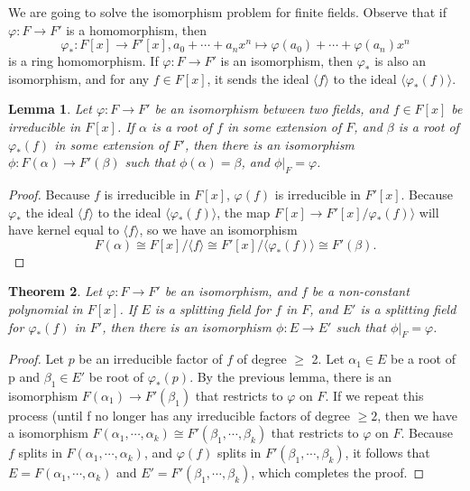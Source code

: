 \documentclass[12pt]{report}
\newtheorem{thm}{Theorem}[section]
\newtheorem{lemma}[thm]{Lemma}
\theoremstyle{definition}
\def\aa{\alpha}
\def\bb{\beta}
\begin{document}
We are going to solve the isomorphism problem for finite fields. Observe that if $\varphi : F \to F'$ is a homomorphism, then
$$\varphi_*:F[x]\to F'[x], a_0+\cdots+a_nx^n\mapsto \varphi(a_0)+\cdots+\varphi(a_n)x^n $$  
is a ring homomorphism. If $\varphi : F \to F'$ is an isomorphism, then $\varphi_*$ is also an isomorphism, and for any $f \in F[x]$, it sends the ideal $\langle f\rangle$ to the ideal $\langle \varphi_*(f)\rangle$.

\begin{lemma}\label{splitlemma1}
    Let $\varphi : F \to F'$ be an isomorphism between two fields, and $f \in F[x]$ be irreducible in $F[x]$. If $\aa$ is a root of $f$ in some extension of $F$, and $\bb$ is a root of $\varphi_*(f)$ in some extension of $F'$, then there is an isomorphism $\phi : F(\aa) \to F'(\bb)$ such that $\phi(\aa) = \bb$, and $\phi|_F= \varphi$.
\end{lemma}

\begin{proof}
    Because $f$ is irreducible in $F[x]$, $\varphi(f)$ is irreducible in $F'[x]$. Because $\varphi_*$ the ideal $\langle f\rangle$ to the ideal $\langle \varphi_*(f)\rangle$, the map $F[x] \to F'[x]/\varphi_*(f)\rangle$ will have kernel equal to $\langle f\rangle$, so we have an isomorphism $$F(\aa)\cong F[x]/\langle f\rangle \cong F'[x]/\langle \varphi_*(f)\rangle \cong F'(\bb).$$
\end{proof}

\begin{thm}
    Let $\varphi: F \to F'$ be an isomorphism, and $f$ be a non-constant polynomial in $F[x]$. If $E$ is a splitting field for $f$ in $F$, and $E'$ is a splitting field for $\varphi_*(f)$ in $F'$, then there is an isomorphism $\phi : E \to E'$ such that $\phi|_F= \varphi$.
\end{thm}

\begin{proof}
    Let $p$ be an irreducible factor of $f$ of degree $\geq$ 2. Let $\aa_1 \in E$ be a root of p and $\bb_1 \in E'$ be root of $\varphi_*(p)$. By the previous lemma, there is an isomorphism $F(\aa_1) \to F'(\bb_1)$ that restricts to $\varphi$ on $F$. If we repeat this process (until f no longer has any irreducible factors of degree $\geq 2$, then we have a isomorphism $F(\aa_1,\cdots, \aa_k) \cong F'(\bb_1,\cdots, \bb_k)$ that restricts to $\varphi$ on $F$. Because $f$ splits in $F(\aa_1,\cdots, \aa_k)$, and $\varphi(f)$ splits in $F'(\bb_1,\cdots, \bb_k)$, it follows that $E = F(\aa_1,\cdots, \aa_k)$ and $E' = F'(\bb_1,\cdots, \bb_k)$, which completes the proof.
\end{proof}
\end{document}
